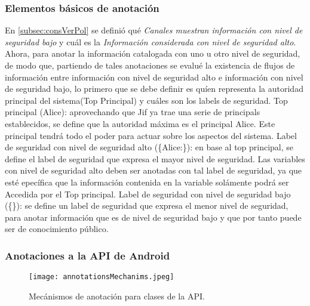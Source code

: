 \subsubsection{Elementos básicos de anotación}
En \ref{subsec:consVerPol} se definió qué \textit{Canales muestran
información con nivel de seguridad bajo} y cuál es la \textit{Información
considerada con nivel de seguridad alto}. Ahora, para anotar la información
catalogada con uno u otro nivel de seguridad, de modo que, partiendo de tales
anotaciones se evalué la existencia de flujos de información entre información
con nivel de seguridad alto e información con nivel de seguridad bajo, lo primero
que se debe definir es quíen representa la autoridad principal del sistema(Top
Principal) y cuáles son los labels de seguridad.\newline 
Top principal (Alice): aprovechando que Jif ya trae una serie de principals
establecidos, se define que la autoridad máxima es el principal Alice. Este
principal tendrá todo el poder para actuar sobre los aspectos del
sistema.\newline 
Label de seguridad con nivel de seguridad alto (\{Alice:\}): en base al top
principal, se define el label de seguridad que expresa el mayor nivel de
seguridad. Las variables con nivel de seguridad alto deben ser anotadas
con tal label de seguridad, ya que esté epecífica que la información
contenida en la variable solámente podrá ser Accedida por el Top
principal.\newline 
Label de seguridad con nivel de seguridad bajo (\{\}): se define un label de
seguridad que expresa el menor nivel de seguridad, para anotar información que
es de nivel de seguridad bajo y que por tanto puede ser de conocimiento público.

\subsubsection{Anotaciones a la API de Android}

\begin{figure}[h!]
	\begin{center}
	\texttt{[image: annotationsMechanims.jpeg]}
	\end{center}
	\caption{Mecánismos de anotación para clases de la API.}
	\label{fig:annotationsMechanims}
\end{figure}

